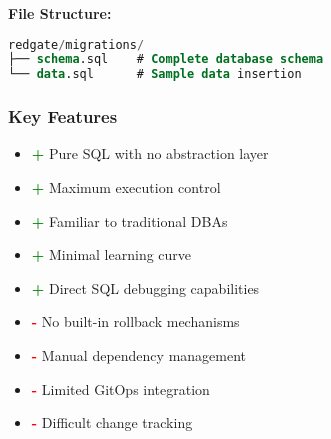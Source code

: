 \textbf{File Structure:}
\begin{lstlisting}[language=SQL, caption=Redgate Script Structure]
redgate/migrations/
├── schema.sql    # Complete database schema
└── data.sql      # Sample data insertion
\end{lstlisting}

\subsubsection{Key Features}
\begin{itemize}
    \item \textcolor{green}{\textbf{+}} Pure SQL with no abstraction layer
    \item \textcolor{green}{\textbf{+}} Maximum execution control
    \item \textcolor{green}{\textbf{+}} Familiar to traditional DBAs
    \item \textcolor{green}{\textbf{+}} Minimal learning curve
    \item \textcolor{green}{\textbf{+}} Direct SQL debugging capabilities
    \item \textcolor{red}{\textbf{-}} No built-in rollback mechanisms
    \item \textcolor{red}{\textbf{-}} Manual dependency management
    \item \textcolor{red}{\textbf{-}} Limited GitOps integration
    \item \textcolor{red}{\textbf{-}} Difficult change tracking
\end{itemize}
